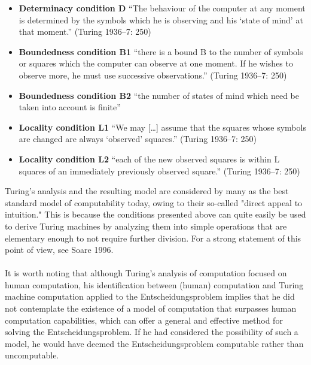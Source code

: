 \documentclass[10pt,a4paper]{article}
\begin{document}
                \begin{itemize}
                    \item \textbf{Determinacy condition D} “The behaviour of the computer at any moment is determined by the symbols which he is observing and his ‘state of mind’ at that moment.” (Turing 1936–7: 250)
                    \item \textbf{Boundedness condition B1} “there is a bound B to the number of symbols or squares which the computer can observe at one moment. If he wishes to observe more, he must use successive observations.” (Turing 1936–7: 250)
                    \item \textbf{Boundedness condition B2} “the number of states of mind which need be taken into account is finite”
                    \item \textbf{Locality condition L1} “We may […] assume that the squares whose symbols are changed are always ‘observed’ squares.” (Turing 1936–7: 250)
                    \item \textbf{Locality condition L2} “each of the new observed squares is within L squares of an immediately previously observed square.” (Turing 1936–7: 250)
                \end{itemize}
                Turing's analysis and the resulting model are considered by many as the best standard model of computability today, owing to their so-called "direct appeal to intuition." This is because the conditions presented above can quite easily be used to derive Turing machines by analyzing them into simple operations that are elementary enough to not require further division. For a strong statement of this point of view, see Soare 1996.
                \\
                \\
                It is worth noting that although Turing's analysis of computation focused on human computation, his identification between (human) computation and Turing machine computation applied to the Entscheidungsproblem implies that he did not contemplate the existence of a model of computation that surpasses human computation capabilities, which can offer a general and effective method for solving the Entscheidungsproblem. If he had considered the possibility of such a model, he would have deemed the Entscheidungsproblem computable rather than uncomputable.
                \\
                \\
\end{document}
